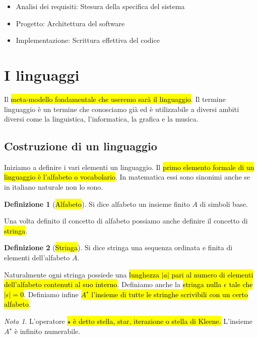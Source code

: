 \documentclass[a4paper,11pt,oneside]{article}
\theoremstyle{plain}
\theoremstyle{definition}
\newtheorem{defn}{Definizione}[section]
\theoremstyle{remark}
\newtheorem*{nota}{Nota}
\begin{document}
\begin{itemize}
  \item Analisi dei requisiti: Stesura della specifica del sistema
  \item Progetto: Architettura del software
  \item Implementazione: Scrittura effettiva del codice
\end{itemize}

\section{I linguaggi}\label{sec:linguaggi}

Il \hl{meta-modello fondamentale che useremo sarà il linguaggio}. Il termine
linguaggio è un termine che conosciamo già ed è utilizzabile a diversi ambiti
diversi come la linguistica, l'informatica, la grafica e la musica.

\subsection{Costruzione di un linguaggio}\label{sec:linguaggi-costruzione}

Iniziamo a definire i vari elementi un linguaggio. Il \hl{primo elemento formale
di un linguaggio è l'alfabeto o vocabolario}. In matematica essi sono sinonimi
anche se in italiano naturale non lo sono.

\begin{defn}[\hl{Alfabeto}]\label{def:alfabeto}
  Si dice alfabeto un insieme finito $A$ di simboli base.
\end{defn}

Una volta definito il concetto di alfabeto possiamo anche definire il concetto
di \hl{stringa}.

\begin{defn}[\hl{Stringa}]\label{def:stringa}
  Si dice stringa una sequenza ordinata e finita di elementi dell'alfabeto $A$.
\end{defn}

Naturalmente ogni stringa possiede una \hl{lunghezza $|a|$ pari al numero di
elementi dell'alfabeto contenuti al suo interno}. Definiamo anche la \hl{stringa
nulla $\epsilon$ tale che $|\epsilon|=0$}. Definiamo infine \hl{$A^\star$
l'insieme di tutte le stringhe scrivibili con un certo alfabeto}.

\begin{nota}
  L'operatore \hl{$\star$ è detto stella, star, iterazione o stella di Kleene.}
  L'insieme $A^\star$ è infinito numerabile.
\end{nota}
\end{document}

